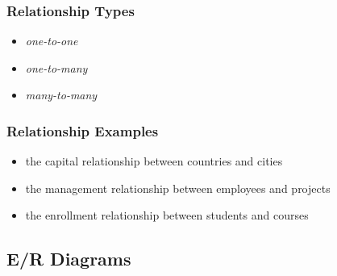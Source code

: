 \documentclass[dvipsnames]{beamer}
\begin{document}
\begin{frame}
  \frametitle{Relationship Types}

  \begin{itemize}
    \item \emph{one-to-one}
    \item \emph{one-to-many}
    \item \emph{many-to-many}
  \end{itemize}
\end{frame}

\begin{frame}
  \frametitle{Relationship Examples}

  \begin{example}
    \begin{itemize}
      \item the capital relationship between countries and cities
    \end{itemize}
  \end{example}

  \pause
  \begin{example}
    \begin{itemize}
      \item the management relationship between employees and projects
    \end{itemize}
  \end{example}

  \pause
  \begin{example}
    \begin{itemize}
      \item the enrollment relationship between students and courses
    \end{itemize}
  \end{example}
\end{frame}

\subsection{E/R Diagrams}
\end{document}
